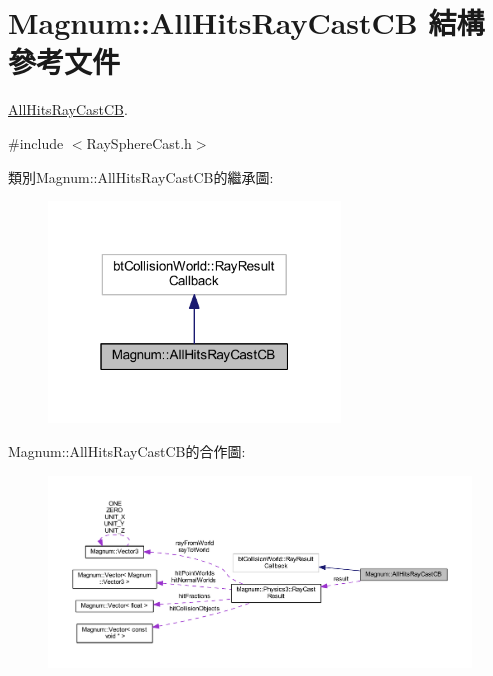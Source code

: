 \hypertarget{struct_magnum_1_1_all_hits_ray_cast_c_b}{}\section{Magnum\+:\+:All\+Hits\+Ray\+Cast\+CB 結構 參考文件}
\label{struct_magnum_1_1_all_hits_ray_cast_c_b}


\hyperlink{struct_magnum_1_1_all_hits_ray_cast_c_b}{All\+Hits\+Ray\+Cast\+CB}.  




{\ttfamily \#include $<$Ray\+Sphere\+Cast.\+h$>$}



類別\+Magnum\+:\+:All\+Hits\+Ray\+Cast\+C\+B的繼承圖\+:\nopagebreak
\begin{figure}[H]
\begin{center}
\leavevmode
\includegraphics[width=220pt]{struct_magnum_1_1_all_hits_ray_cast_c_b__inherit__graph}
\end{center}
\end{figure}


Magnum\+:\+:All\+Hits\+Ray\+Cast\+C\+B的合作圖\+:\nopagebreak
\begin{figure}[H]
\begin{center}
\leavevmode
\includegraphics[width=350pt]{struct_magnum_1_1_all_hits_ray_cast_c_b__coll__graph}
\end{center}
\end{figure}
